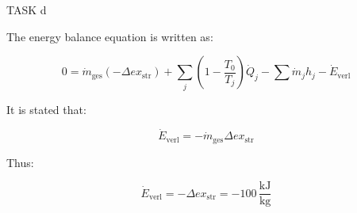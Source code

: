 TASK d

The energy balance equation is written as:

\[
0 = \dot{m}_{\text{ges}} (-\Delta ex_{\text{str}}) + \sum_j \left( 1 - \frac{T_0}{T_j} \right) \dot{Q}_j - \sum \dot{m}_j h_j - \dot{E}_{\text{verl}}
\]

It is stated that:

\[
\dot{E}_{\text{verl}} = -\dot{m}_{\text{ges}} \Delta ex_{\text{str}}
\]

Thus:

\[
\dot{E}_{\text{verl}} = -\Delta ex_{\text{str}} = -100 \, \frac{\text{kJ}}{\text{kg}}
\]